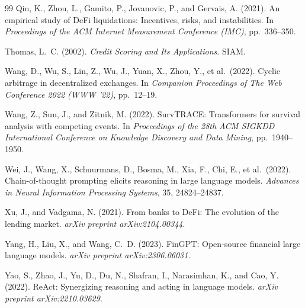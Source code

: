\documentclass[12pt,a4paper]{article}
\begin{document}
\begin{thebibliography}{99}
Qin, K., Zhou, L., Gamito, P., Jovanovic, P., and Gervais, A. (2021).
An empirical study of DeFi liquidations: Incentives, risks, and instabilities.
In \textit{Proceedings of the ACM Internet Measurement Conference (IMC)},
pp.\ 336--350.

Thomas, L.~C. (2002).
\textit{Credit Scoring and Its Applications}.
SIAM.

Wang, D., Wu, S., Lin, Z., Wu, J., Yuan, X., Zhou, Y., et al.\ (2022).
Cyclic arbitrage in decentralized exchanges.
In \textit{Companion Proceedings of The Web Conference 2022 (WWW '22)},
pp.\ 12--19.

Wang, Z., Sun, J., and Zitnik, M. (2022).
SurvTRACE: Transformers for survival analysis with competing events.
In \textit{Proceedings of the 28th ACM SIGKDD International Conference on
Knowledge Discovery and Data Mining}, pp.\ 1940--1950.

Wei, J., Wang, X., Schuurmans, D., Bosma, M., Xia, F., Chi, E., et al.\
(2022).
Chain-of-thought prompting elicits reasoning in large language models.
\textit{Advances in Neural Information Processing Systems}, 35, 24824--24837.

Xu, J., and Vadgama, N. (2021).
From banks to DeFi: The evolution of the lending market.
\textit{arXiv preprint arXiv:2104.00344}.

Yang, H., Liu, X., and Wang, C.~D. (2023).
FinGPT: Open-source financial large language models.
\textit{arXiv preprint arXiv:2306.06031}.

Yao, S., Zhao, J., Yu, D., Du, N., Shafran, I., Narasimhan, K., and Cao, Y.
(2022).
ReAct: Synergizing reasoning and acting in language models.
\textit{arXiv preprint arXiv:2210.03629}.

\end{thebibliography}
\end{document}
